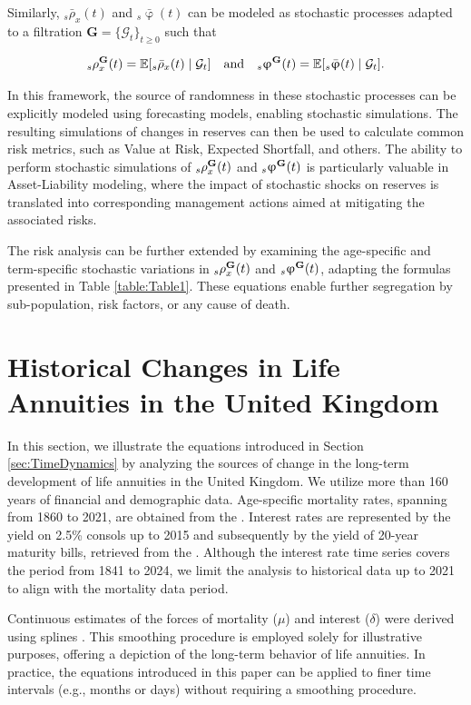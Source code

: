 \documentclass[12pt]{article}
\begin{document}
{Similarly, \( {}_s\bar{\rho}_x(t) \) and \( {}_s\bar{\upvarphi}(t) \) can be modeled as stochastic processes adapted to a filtration \( \textbf{G} = \{\mathcal{G}_t\}_{t \ge 0} \) such that 

\[
{}_s{\rho}^{\bf{G}}_x(t) = \mathbb{E}[{}_s\bar{\rho}_x(t) \mid \mathcal{G}_t] \quad \text{and} \quad {}_s{\upvarphi}^{\bf{G}}(t) = \mathbb{E}[{}_s\bar{\upvarphi}(t) \mid \mathcal{G}_t].
\]

In this framework, the source of randomness in these stochastic processes can be explicitly modeled using forecasting models, enabling stochastic simulations. The resulting simulations of changes in reserves can then be used to calculate common risk metrics, such as Value at Risk, Expected Shortfall, and others. The ability to perform stochastic simulations of \( {}_s{\rho}^{\bf{G}}_x(t) \) and \( {}_s{\upvarphi}^{\bf{G}}(t) \) is particularly valuable in Asset-Liability modeling, where the impact of stochastic shocks on reserves is translated into corresponding management actions aimed at mitigating the associated risks.

The risk analysis can be further extended by examining the age-specific and term-specific stochastic variations in \( {}_s{\rho}^{\bf{G}}_x(t) \) and \( {}_s{\upvarphi}^{\bf{G}}(t) \), adapting the formulas presented in Table \ref{table:Table1}. These equations enable further segregation by sub-population, risk factors, or any cause of death.


\section{Historical Changes in Life Annuities in the United Kingdom}\label{sec:UK_Illustration}

In this section, we illustrate the equations introduced in Section \ref{sec:TimeDynamics} by analyzing the sources of change in the long-term development of life annuities in the United Kingdom. We utilize more than 160 years of financial and demographic data. Age-specific mortality rates, spanning from 1860 to 2021, are obtained from the \citet{HMD2024}. Interest rates are represented by the yield on 2.5\% consols up to 2015 and subsequently by the yield of 20-year maturity bills, retrieved from the \citet{BankOfEngland2024}. Although the interest rate time series covers the period from 1841 to 2024, we limit the analysis to historical data up to 2021 to align with the mortality data period.

Continuous estimates of the forces of mortality (\(\mu\)) and interest (\(\delta\)) were derived using splines \citep{green1993nonparametric,camarda2012mortalitysmooth}. This smoothing procedure is employed solely for illustrative purposes, offering a depiction of the long-term behavior of life annuities. In practice, the equations introduced in this paper can be applied to finer time intervals (e.g., months or days) without requiring a smoothing procedure.


}
\end{document}
